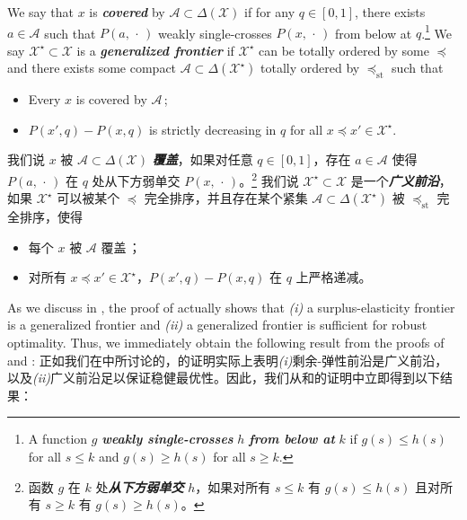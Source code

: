 \documentclass[12pt,letterpaper]{article}
\newenvironment{original}{\color{black}\noindent}{}
\newenvironment{translation}{\color{blue}\noindent}{}
\theoremstyle{plain}
\theoremstyle{definition}
\theoremstyle{remark}
\renewcommand{\1}{\mathds{1}}
\newcommand{\X}{\mathcal{X}}
\theoremstyle{definition}
\begin{document}
\begin{original}
We say that $x$ is \textit{\textbf{covered}} by $\mathcal{A} \subset \Delta(\mathcal{X})$ if for any $q\in [0, 1]$, there exists $a \in \mathcal{A}$ such that $P(a, \,\cdot\,)$ weakly single-crosses $P(x, \,\cdot\,)$ from below at $q$.\footnote{A function $g$ \textit{\textbf{weakly single-crosses}} $h$ \textit{\textbf{from below at}} $k$ if $g(s) \leq h(s)$ for all $s \leq k$ and $g(s) \geq h(s)$ for all $s \geq k$.}
We say $\mathcal{X}^\star \subset \mathcal{X}$ is a \textit{\textbf{generalized frontier}} if $\X^\star$ can be totally ordered by some $\preceq$ and there exists some compact $\mathcal{A} \subset \Delta(\X^\star)$ totally ordered by $\preceq_{\text{st}}$ such that
\begin{itemize}
    \item[\textit{(i)}]  Every $x$ is covered by $\mathcal{A}$\,;
    \item[\textit{(ii)}] $P(x', q) - P(x, q)$ is strictly decreasing in $q$ for all $x \preceq x' \in \X^\star$.
\end{itemize}
\end{original}
\begin{translation}
我们说 $x$ 被 $\mathcal{A} \subset \Delta(\mathcal{X})$ \textit{\textbf{覆盖}}，如果对任意 $q\in [0, 1]$，存在 $a \in \mathcal{A}$ 使得 $P(a, \,\cdot\,)$ 在 $q$ 处从下方弱单交 $P(x, \,\cdot\,)$。\footnote{函数 $g$ 在 $k$ 处\textit{\textbf{从下方弱单交}} $h$，如果对所有 $s \leq k$ 有 $g(s) \leq h(s)$ 且对所有 $s \geq k$ 有 $g(s) \geq h(s)$。}
我们说 $\mathcal{X}^\star \subset \mathcal{X}$ 是一个\textit{\textbf{广义前沿}}，如果 $\X^\star$ 可以被某个 $\preceq$ 完全排序，并且存在某个紧集 $\mathcal{A} \subset \Delta(\X^\star)$ 被 $\preceq_{\text{st}}$ 完全排序，使得
\begin{itemize}
    \item[\textit{(i)}]  每个 $x$ 被 $\mathcal{A}$ 覆盖\,；
    \item[\textit{(ii)}] 对所有 $x \preceq x' \in \X^\star$，$P(x', q) - P(x, q)$ 在 $q$ 上严格递减。
\end{itemize}
\end{translation}

\begin{original}
As we discuss in , the proof of  actually shows that \textit{(i)} a surplus-elasticity frontier is a generalized frontier and \textit{(ii)} a generalized frontier is sufficient for robust optimality. Thus, we immediately obtain the following result from the proofs of  and :
\end{original}
\begin{translation}
正如我们在中所讨论的，的证明实际上表明\textit{(i)}剩余-弹性前沿是广义前沿，以及\textit{(ii)}广义前沿足以保证稳健最优性。因此，我们从和的证明中立即得到以下结果：
\end{translation}
\end{document}
